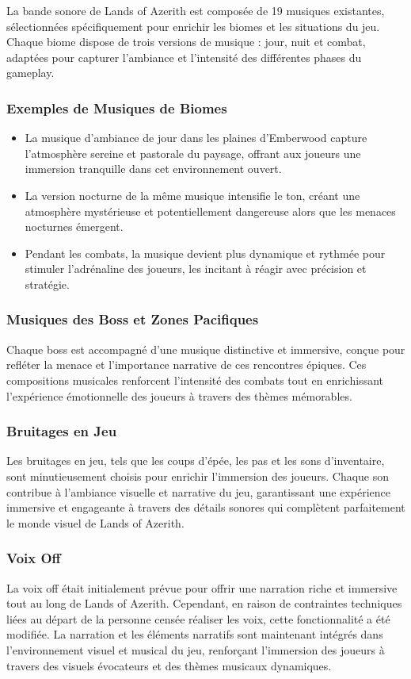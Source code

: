 La bande sonore de Lands of Azerith est composée de 19 musiques existantes, sélectionnées spécifiquement pour enrichir les biomes et les situations du jeu. 
Chaque biome dispose de trois versions de musique : jour, nuit et combat, adaptées pour capturer l'ambiance et l'intensité des différentes phases du gameplay.

\subsubsection{Exemples de Musiques de Biomes}

\begin{itemize}
    \item La musique d'ambiance de jour dans les plaines d'Emberwood capture l'atmosphère sereine et pastorale du paysage, offrant aux joueurs une immersion tranquille dans cet environnement ouvert.
    \item La version nocturne de la même musique intensifie le ton, créant une atmosphère mystérieuse et potentiellement dangereuse alors que les menaces nocturnes émergent.
    \item Pendant les combats, la musique devient plus dynamique et rythmée pour stimuler l'adrénaline des joueurs, les incitant à réagir avec précision et stratégie.
\end{itemize}

\subsubsection{Musiques des Boss et Zones Pacifiques}

Chaque boss est accompagné d'une musique distinctive et immersive, conçue pour refléter la menace et l'importance narrative de ces rencontres épiques. 
Ces compositions musicales renforcent l'intensité des combats tout en enrichissant l'expérience émotionnelle des joueurs à travers des thèmes mémorables.

\subsubsection{Bruitages en Jeu}

Les bruitages en jeu, tels que les coups d'épée, les pas et les sons d'inventaire, sont minutieusement choisis pour enrichir l'immersion des joueurs. 
Chaque son contribue à l'ambiance visuelle et narrative du jeu, garantissant une expérience immersive et engageante à travers des détails sonores qui complètent parfaitement le monde visuel de Lands of Azerith.

\subsubsection{Voix Off}

La voix off était initialement prévue pour offrir une narration riche et immersive tout au long de Lands of Azerith. Cependant, en raison de contraintes techniques liées au départ de la personne censée réaliser les voix, cette fonctionnalité a été modifiée. La narration et les éléments narratifs sont maintenant intégrés dans l'environnement visuel et musical du jeu, renforçant l'immersion des joueurs à travers des visuels évocateurs et des thèmes musicaux dynamiques.
